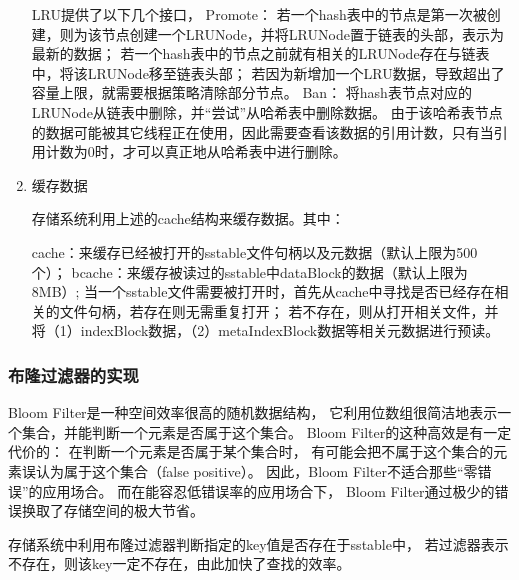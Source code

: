 \begin{enumerate}
LRU提供了以下几个接口，
Promote：
若一个hash表中的节点是第一次被创建，则为该节点创建一个LRUNode，并将LRUNode置于链表的头部，表示为最新的数据；
若一个hash表中的节点之前就有相关的LRUNode存在与链表中，将该LRUNode移至链表头部；
若因为新增加一个LRU数据，导致超出了容量上限，就需要根据策略清除部分节点。
Ban：
将hash表节点对应的LRUNode从链表中删除，并“尝试”从哈希表中删除数据。
由于该哈希表节点的数据可能被其它线程正在使用，因此需要查看该数据的引用计数，只有当引用计数为0时，才可以真正地从哈希表中进行删除。

		\item 缓存数据 
		
		存储系统利用上述的cache结构来缓存数据。其中：

cache：来缓存已经被打开的sstable文件句柄以及元数据（默认上限为500个）；
bcache：来缓存被读过的sstable中dataBlock的数据（默认上限为8MB）;
当一个sstable文件需要被打开时，首先从cache中寻找是否已经存在相关的文件句柄，若存在则无需重复打开；
若不存在，则从打开相关文件，并将（1）indexBlock数据，（2）metaIndexBlock数据等相关元数据进行预读。

		\end{enumerate}
		

		\subsubsection{布隆过滤器的实现}


		Bloom Filter是一种空间效率很高的随机数据结构，
		它利用位数组很简洁地表示一个集合，并能判断一个元素是否属于这个集合。
		Bloom Filter的这种高效是有一定代价的：
		在判断一个元素是否属于某个集合时，
		有可能会把不属于这个集合的元素误认为属于这个集合（false positive）。
		因此，Bloom Filter不适合那些“零错误”的应用场合。
		而在能容忍低错误率的应用场合下，
		Bloom Filter通过极少的错误换取了存储空间的极大节省。

存储系统中利用布隆过滤器判断指定的key值是否存在于sstable中，
若过滤器表示不存在，则该key一定不存在，由此加快了查找的效率。

